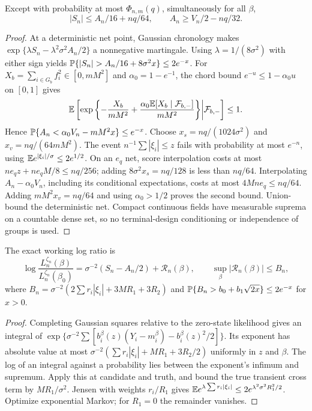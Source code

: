 \begin{theorem}
\label{thm:variance}
Except with probability at most $\Phi_{n,m}(q)$, simultaneously for all $\beta$,
\begin{equation}
 |S_n|\le A_n/16+nq/64,\qquad A_n\ge V_n/2-nq/32.
 \label{eq:variance-event}
\end{equation}
\end{theorem}
\begin{proof}
At a deterministic net point, Gaussian chronology makes
$\exp\{\lambda S_n-\lambda^2\sigma^2A_n/2\}$ a nonnegative martingale.
Using $\lambda=1/(8\sigma^2)$ with either sign yields
$\Pp\{|S_n|>A_n/16+8\sigma^2x\}\le2e^{-x}$.
For $X_b=\sum_{i\in G_b}f_i^2\in[0,mM^2]$ and $\alpha_0=1-e^{-1}$,
the chord bound $e^{-u}\le1-\alpha_0u$ on $[0,1]$ gives
\[
 \mathbb E\left[\exp\left\{-\frac{X_b}{mM^2}
 +\frac{\alpha_0\mathbb E[X_b\mid\mathcal F_{b,-}]}{mM^2}\right\}
 \middle|\mathcal F_{b,-}\right]\le1.
\]
Hence $\mathbb P\{A_n<\alpha_0 V_n-mM^2x\}\le e^{-x}$.
Choose $x_s=nq/(1024\sigma^2)$ and $x_v=nq/(64mM^2)$.
The event $n^{-1}\sum|\xi_i|\le z$ fails with probability at most $e^{-n}$,
using $\mathbb E e^{|\xi_i|/\sigma}\le2e^{1/2}$.
On an $e_q$ net, score interpolation costs at most
$ne_qz+ne_qM/8\le nq/256$; adding $8\sigma^2x_s=nq/128$ is less than
$nq/64$. Interpolating $A_n-\alpha_0V_n$, including its conditional
expectations, costs at most $4Mne_q\le nq/64$. Adding $mM^2x_v=nq/64$
and using $\alpha_0>1/2$ proves the second bound. Union-bound the deterministic
net. Compact continuous fields have measurable suprema on a countable dense
set, so no terminal-design conditioning or independence of groups is used.
\end{proof}

\begin{lemma}
\label{lem:nuisance}
The exact working log ratio is
\[
 \log\frac{L_n^{\zeta_n}(\beta)}{L_n^{\zeta_n}(\beta_0)}
 =\sigma^{-2}(S_n-A_n/2)+\mathcal R_n(\beta),\qquad
 \sup_\beta|\mathcal R_n(\beta)|\le B_n,
\]
where $B_n=\sigma^{-2}(2\sum r_i|\xi_i|+3MR_1+3R_2)$ and
$\mathbb P\{B_n>b_0+b_1\sqrt{2x}\}\le2e^{-x}$ for $x>0$.
\end{lemma}
\begin{proof}
Completing Gaussian squares relative to the zero-state likelihood gives an
integral of
$\exp\{\sigma^{-2}\sum[b_i^\beta(z)(Y_i-m_i^\beta)-b_i^\beta(z)^2/2]\}$.
Its exponent has absolute value at most
$\sigma^{-2}(\sum r_i|\xi_i|+MR_1+3R_2/2)$ uniformly in $z$ and $\beta$.
The log of an integral against a probability lies between the exponent's
infimum and supremum. Apply this at candidate and truth, and bound the true
transient cross term by $MR_1/\sigma^2$.
Jensen with weights $r_i/R_1$ gives
$\mathbb E e^{\lambda\sum r_i|\xi_i|}\le2e^{\lambda^2\sigma^2R_1^2/2}$.
Optimize exponential Markov; for $R_1=0$ the remainder vanishes.
\end{proof}

